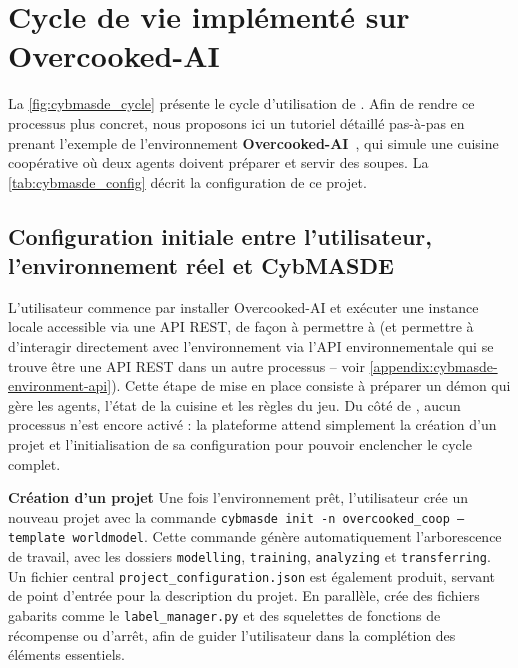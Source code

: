\section{Cycle de vie implémenté sur Overcooked-AI}

La \autoref{fig:cybmasde_cycle} présente le cycle d'utilisation de .
Afin de rendre ce processus plus concret, nous proposons ici un tutoriel détaillé pas-à-pas en prenant l'exemple de l'environnement \textbf{Overcooked-AI}~\cite{overcookedai}, qui simule une cuisine coopérative où deux agents doivent préparer et servir des soupes. La \autoref{tab:cybmasde_config} décrit la configuration de ce projet.

\subsection{Configuration initiale entre l'utilisateur, l'environnement réel et CybMASDE}

L'utilisateur commence par installer Overcooked-AI et exécuter une instance locale accessible via une API REST, de façon à permettre à  (et permettre à  d'interagir directement avec l'environnement via l'API environnementale qui se trouve être une API REST dans un autre processus -- voir \autoref{appendix:cybmasde-environment-api}). Cette étape de mise en place consiste à préparer un démon qui gère les agents, l'état de la cuisine et les règles du jeu. Du côté de , aucun processus n'est encore activé : la plateforme attend simplement la création d'un projet et l'initialisation de sa configuration pour pouvoir enclencher le cycle complet.

\noindent
\textbf{Création d'un projet} \quad
Une fois l'environnement prêt, l'utilisateur crée un nouveau projet avec la commande \texttt{cybmasde init -n overcooked\_coop --template worldmodel}. Cette commande génère automatiquement l'arborescence de travail, avec les dossiers \texttt{modelling}, \texttt{training}, \texttt{analyzing} et \texttt{transferring}. Un fichier central \texttt{project\_configuration.json} est également produit, servant de point d'entrée pour la description du projet. En parallèle,  crée des fichiers gabarits comme le \texttt{label\_manager.py} et des squelettes de fonctions de récompense ou d'arrêt, afin de guider l'utilisateur dans la complétion des éléments essentiels.

